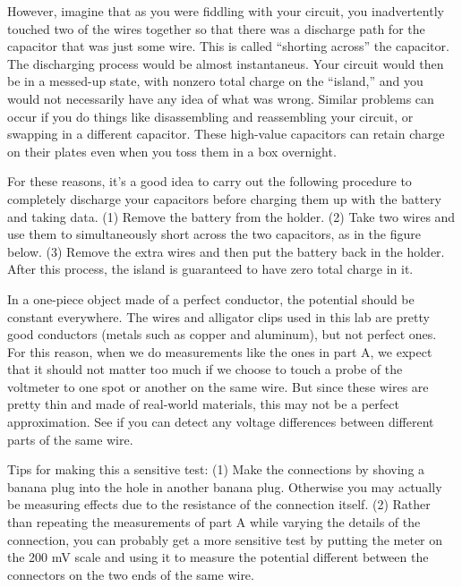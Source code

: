 
However, imagine that as you were fiddling
with your circuit, you inadvertently touched two of the wires together so that there was
a discharge path for the capacitor that was just some wire. This is called ``shorting across''
the capacitor. The discharging process would
be almost instantaneus. Your circuit would then be in a messed-up state, with nonzero total charge on the ``island,'' and you would
not necessarily have any idea of what was wrong. Similar problems can occur if you do things like
disassembling and reassembling your circuit, or swapping in a different capacitor. These high-value capacitors
can retain charge on their plates even when you toss them in a box overnight.

For these reasons, it's a good idea to carry out the following procedure to completely discharge
your capacitors before charging them up with the battery and taking data.
(1) Remove the battery from the holder. (2) Take two wires and use them to simultaneously
 short across the two capacitors, as in the figure below. (3) Remove the extra wires and then
put the battery back in the holder.
 After this process, the island is guaranteed to have zero
total charge in it.




In a one-piece object made of a perfect conductor, the potential should be constant everywhere.
The wires and alligator clips used in this lab are pretty good conductors (metals
such as copper and aluminum), but not perfect ones. For this reason, when we do
measurements like the ones in part A, we expect that it should
not matter too much if we choose to touch a probe of the voltmeter to one spot or another
on the same wire. But since these wires are pretty thin and made of real-world materials,
this may not be a perfect approximation. See if you can detect any voltage differences
between different parts of the same wire. 

Tips for making this a sensitive test: (1) Make the connections by shoving a banana plug into
the hole in another banana plug. Otherwise you may actually be measuring effects due to the
resistance of the connection itself. (2) Rather than repeating the measurements of
part A while varying the details of the connection, you can probably
get a more sensitive test by putting the meter on the 200 mV scale and using it to measure
the potential different between the connectors on the two ends of the same wire.

